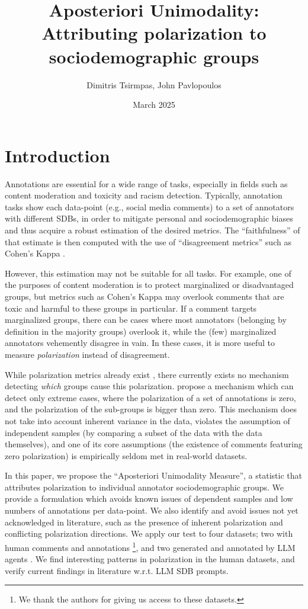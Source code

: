 \documentclass{article}
\title{Aposteriori Unimodality: Attributing polarization to sociodemographic groups}
\author{Dimitris Tsirmpas, John Pavlopoulos}
\date{March 2025}
\begin{document}
\maketitle


\section{Introduction}

Annotations are essential for a wide range of tasks, especially in fields such as content moderation and toxicity and racism detection. Typically, annotation tasks show each data-point (e.g., social media comments) to a set of annotators with different \acp{SDB}, in order to mitigate personal and sociodemographic biases and thus acquire a robust estimation of the desired metrics. The ``faithfulness'' of that estimate is then computed with the use of ``disagreement metrics'' such as Cohen's Kappa \cite{Cohen_1960}. 

However, this estimation may not be suitable for all tasks. For example, one of the purposes of content moderation is to protect marginalized or disadvantaged groups, but metrics such as Cohen's Kappa may overlook comments that are toxic and harmful to these groups in particular. If a comment targets marginalized groups, there can be cases where most annotators (belonging by definition in the majority groups) overlook it, while the (few) marginalized annotators vehemently disagree in vain. In these cases, it is more useful to measure \textit{polarization} instead of disagreement.

While polarization metrics already exist \parencite{Pavlopoulos2023, pavlopoulos-likas-2024}, there currently exists no mechanism detecting \textit{which} groups cause this polarization. \textcite{pavlopoulos-likas-2024} propose a mechanism which can detect only extreme cases, where the polarization of a set of annotations is zero, and the polarization of the sub-groups is bigger than zero. This mechanism does not take into account inherent variance in the data, violates the assumption of independent samples (by comparing a subset of the data with the data themselves), and one of its core assumptions (the existence of comments featuring zero polarization) is empirically seldom met in real-world datasets.

In this paper, we propose the ``Aposteriori Unimodality Measure'', a statistic that attributes polarization to individual annotator sociodemographic groups. We provide a formulation which avoids known issues of dependent samples and low numbers of annotations per data-point. We also identify and avoid issues not yet acknowledged in literature, such as the presence of inherent polarization and conflicting polarization directions. We apply our test to four datasets; two with human comments and annotations \parencite{sap-etal-2022-annotators, kumar-et-al-2021}\footnote{We thank the authors for giving us access to these datasets.}, and two generated and annotated by \ac{LLM} agents \cite{tsirmpas2025scalableevaluationonlinefacilitation}. We find interesting patterns in polarization in the human datasets, and verify current findings in literature w.r.t. \ac{LLM} \ac{SDB} prompts.
\end{document}

